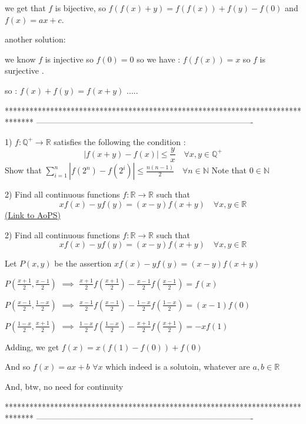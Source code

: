 \begin{solution}
	we get that $f$ is bijective, so $f(f(x)+y)=f(f(x))+f(y)-f(0)$ and $f(x)=ax+c$.
\end{solution}



\begin{solution}
	another solution: 

we know $f$ is injective so $f(0)=0$ so we have : $f(f(x))=x$ so $f$ is surjective . 

so : $f(x)+f(y)=f(x+y)$ .....
\end{solution}
*******************************************************************************
-------------------------------------------------------------------------------

\begin{problem}
	1) $f:\mathbb{Q}^+\to \mathbb{R}$ satisfies the following the condition : 
\[\left | f(x+y)-f(x) \right | \leq \frac{y}{x} \quad \forall x,y \in \mathbb{Q}^+ \]
Show that  $\sum_{i=1}^{n}\left | f(2^{n})-f(2^{i}) \right |\leq\frac{n(n-1)}{2} \quad \forall n \in \mathbb{N}$
Note that $0 \in \mathbb{N}$

2) Find all continuous functions $f:\mathbb{R}\to\mathbb{R}$  such that
\[xf(x)-yf(y)=(x-y)f(x+y) \quad \forall x,y \in \mathbb{R}\]
	\flushright \href{https://artofproblemsolving.com/community/c6h563765}{(Link to AoPS)}
\end{problem}



\begin{solution}
	\begin{tcolorbox}2) Find all continuous functions $f:\mathbb{R}\to\mathbb{R}$  such that
\[xf(x)-yf(y)=(x-y)f(x+y) \quad \forall x,y \in \mathbb{R}\]\end{tcolorbox}
Let $P(x,y)$ be the assertion $xf(x)-yf(y)=(x-y)f(x+y)$

$P(\frac{x+1}2,\frac{x-1}2)$ $\implies$ $\frac{x+1}2f(\frac{x+1}2)-\frac{x-1}2f(\frac{x-1}2)=f(x)$

$P(\frac{x-1}2,\frac{1-x}2)$ $\implies$ $\frac{x-1}2f(\frac{x-1}2)-\frac{1-x}2f(\frac{1-x}2)=(x-1)f(0)$

$P(\frac{1-x}2,\frac{x+1}2)$ $\implies$ $\frac{1-x}2f(\frac{1-x}2)-\frac{x+1}2f(\frac{x+1}2)=-xf(1)$

Adding, we get $f(x)=x(f(1)-f(0))+f(0)$

And so $\boxed{f(x)=ax+b}$ $\forall x$ which indeed is a solutoin, whatever are $a,b\in\mathbb R$

And, btw, no need for continuity
\end{solution}
*******************************************************************************
-------------------------------------------------------------------------------

